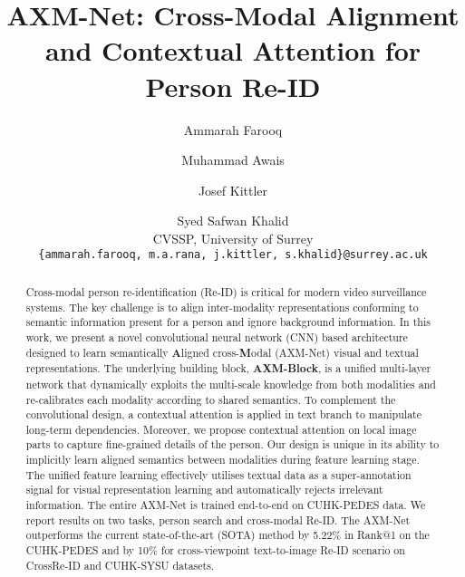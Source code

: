 \documentclass[10pt,twocolumn,letterpaper]{article}
\begin{document}
\title{AXM-Net: Cross-Modal Alignment and Contextual Attention for Person Re-ID}


\author{Ammarah Farooq
\and
Muhammad Awais
\and
Josef Kittler
\and
Syed Safwan Khalid\\
CVSSP, University of Surrey\\
{\tt\small \{ammarah.farooq, m.a.rana, j.kittler, s.khalid\}@surrey.ac.uk}

}

\maketitle


\begin{abstract}
    Cross-modal person re-identification (Re-ID) is critical for modern video surveillance systems. The key challenge is to align inter-modality representations conforming to semantic information present for a person and ignore background information. In this work, we present a novel convolutional neural network (CNN) based architecture designed to learn semantically \textbf{A}ligned cross-\textbf{M}odal (AXM-Net) visual and textual representations. The underlying building block, \textbf{AXM-Block}, is a unified multi-layer network that dynamically exploits the multi-scale knowledge from both modalities and re-calibrates each modality according to shared semantics. To complement the convolutional design, a contextual attention is applied in text branch to manipulate long-term dependencies. Moreover, we propose contextual attention on local image parts to capture fine-grained details of the person. Our design is unique in its ability to implicitly learn aligned semantics between modalities during feature learning stage. The unified feature learning effectively utilises textual data as a super-annotation signal for visual representation learning and automatically rejects irrelevant information. The entire AXM-Net is trained end-to-end on CUHK-PEDES data. We report results on two tasks, person search and cross-modal Re-ID. The AXM-Net outperforms the current state-of-the-art (SOTA) method by 5.22\% in Rank@1 on the CUHK-PEDES and by 10\% for cross-viewpoint text-to-image Re-ID scenario on CrossRe-ID and CUHK-SYSU datasets.
\end{abstract}
\end{document}

